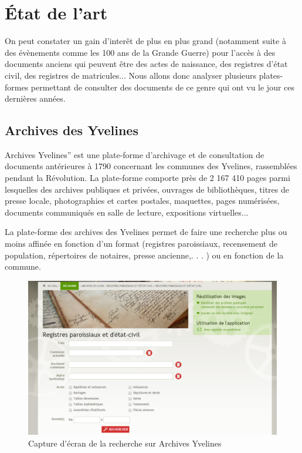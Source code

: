 \section{État de l'art}
\label{sec:etat_art}
On peut constater un gain d’interêt de plus en plus grand (notamment suite à des évènements comme les 100 ans
de la Grande Guerre) pour l’accès à des documents anciens qui peuvent être des actes de naissance, des registres
d’état civil, des registres de matricules... Nous allons donc analyser plusieurs plates-formes permettant
de consulter des documents de ce genre qui ont vu le jour ces dernières années.

        \subsection{Archives des Yvelines}
        \label{subsec:yvelines}
        Archives Yvelines” est une plate-forme d’archivage et de consultation de documents antérieures à 1790
        concernant les communes des Yvelines, rassemblées pendant la Révolution. La plate-forme comporte près
        de 2 167 410 pages parmi lesquelles des archives publiques et privées, ouvrages de bibliothèques, titres de presse locale,
        photographies et cartes postales, maquettes, pages numérisées, documents communiqués en salle de lecture, expositions virtuelles...

        La plate-forme des archives des Yvelines permet de faire une recherche plus ou moins affinée en fonction d’un format
        (registres paroissiaux, recensement de population, répertoires de notaires, presse ancienne,. . . ) ou en fonction de la commune.

        \begin{figure}[H]
            \centering
            \includegraphics[width=1\textwidth]{figure/screen_yvelines_recherche.png}
            \caption{Capture d'écran de la recherche sur Archives Yvelines}
            \label{fig:yvelines_recherche}
        \end{figure}


